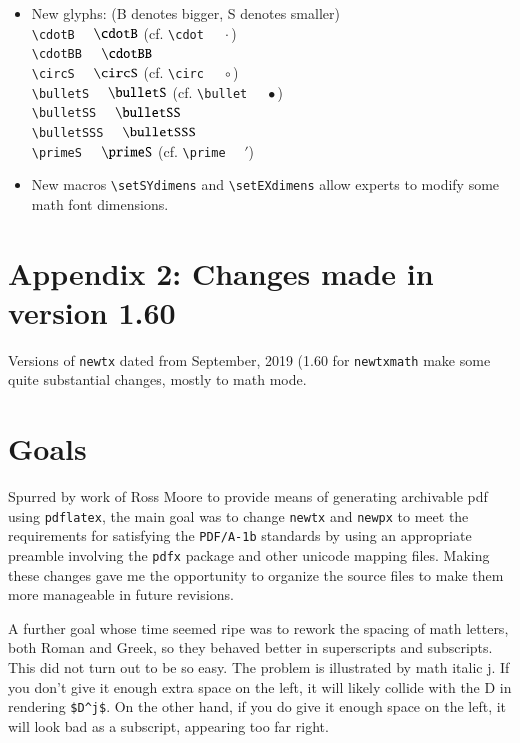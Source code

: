 \documentclass[\fsc]{article}
\theoremstyle{oldplain}
\theoremstyle{plain}
\begin{document}
\begin{itemize}
\verb|\hattilde|$\quad\hattilde{}$\\
\verb|\hathat|$\quad\hathat{}$\\
\item New glyphs: (B denotes bigger, S denotes smaller)\\
\verb|\cdotB| $\quad\cdotB$ (cf. \verb|\cdot| $\quad\cdot$)\\
\verb|\cdotBB| $\quad\cdotBB$\\
\verb|\circS| $\quad\circS$ (cf. \verb|\circ| $\quad\circ$)\\
\verb|\bulletS| $\quad\bulletS$ (cf. \verb|\bullet| $\quad\bullet$)\\
\verb|\bulletSS| $\quad\bulletSS$\\
\verb|\bulletSSS| $\quad\bulletSSS$\\
\verb|\primeS| $\quad\primeS$ (cf. \verb|\prime| $\quad\prime$)\\
\item New macros \verb|\setSYdimens| and \verb|\setEXdimens| allow experts to modify some math font dimensions.
\end{itemize}
\def\jj{\mkern-3mu j}

\section{Appendix 2: Changes made in version 1.60}
Versions of {\tt newtx}  dated from September, 2019 (1.60 for {\tt newtxmath} make some quite substantial changes, mostly to math mode. 
\section{Goals}
Spurred by work of Ross Moore to provide means of generating archivable pdf using {\tt pdflatex}, the main goal was to change {\tt newtx} and {\tt newpx} to meet the requirements for satisfying the {\tt PDF/A-1b} standards by using an appropriate preamble involving the {\tt pdfx} package and other unicode mapping files. Making these  changes  gave me the opportunity to organize the source files to make them more manageable in  future revisions. 

A further goal whose time seemed ripe was to rework the  spacing of math letters, both Roman and Greek, so they behaved better in superscripts and subscripts. This did not turn out to be so easy. The problem is illustrated by math italic j. If you don't give it enough extra space on the left, it will likely collide with the D in rendering \verb|$D^j$|. On the other hand, if you do give it enough space on the left, it will look bad as a  subscript, appearing too far right. 
\end{document}
